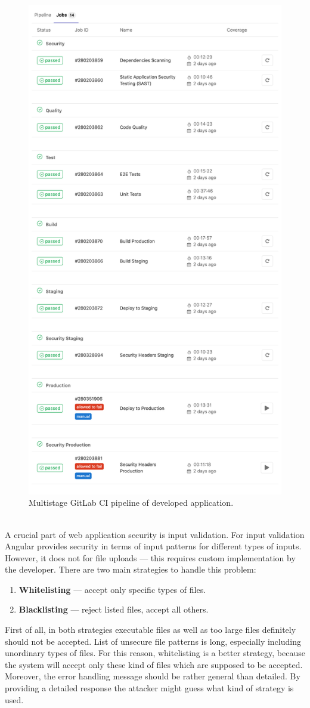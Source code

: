 \documentclass{article} %
\begin{document}
\begin{figure}[ht]
  \centering
      \includegraphics[width=.55\textwidth]{pipeline.png}
  \caption{Multistage GitLab CI pipeline of developed application.}
  \label{fig:pipeline}
\end{figure}\\
\newline
A crucial part of web application security is input validation. For input validation Angular provides security in terms of input patterns for different types of inputs. However, it does not for file uploads --- this requires custom implementation by the developer. There are two main strategies to handle this problem:
\begin{enumerate}
    \item \textbf{Whitelisting} --- accept only specific types of files.
    \item \textbf{Blacklisting} --- reject listed files, accept all others.
\end{enumerate}
First of all, in both strategies executable files as well as too large files definitely should not be accepted. List of unsecure file patterns is long, especially including unordinary types of files. For this reason, whitelisting is a better strategy, because the system will accept only these kind of files which are supposed to be accepted. Moreover, the error handling message should be rather general than detailed. By providing a detailed response the attacker might guess what kind of strategy is used.\\
\end{document}
